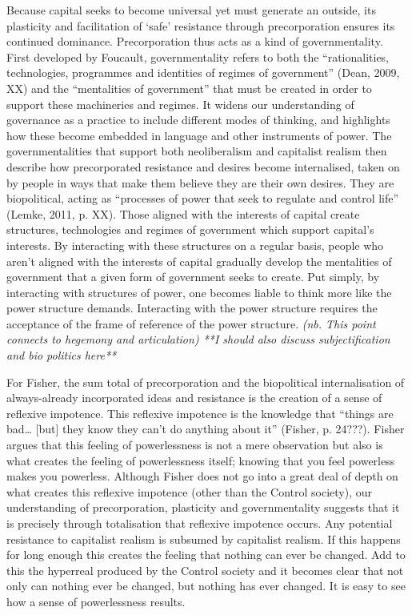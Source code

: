 Because capital seeks to become universal yet must generate an outside,
its plasticity and facilitation of `safe' resistance through
precorporation ensures its continued dominance. Precorporation thus acts
as a kind of governmentality. First developed by Foucault,
governmentality refers to both the ``rationalities, technologies,
programmes and identities of regimes of government'' (Dean, 2009, XX)
and the ``mentalities of government'' that must be created in order to
support these machineries and regimes. It widens our understanding of
governance as a practice to include different modes of thinking, and
highlights how these become embedded in language and other instruments
of power. The governmentalities that support both neoliberalism and
capitalist realism then describe how precorporated resistance and
desires become internalised, taken on by people in ways that make them
believe they are their own desires. They are biopolitical, acting as
``processes of power that seek to regulate and control life'' (Lemke,
2011, p. XX). Those aligned with the interests of capital create
structures, technologies and regimes of government which support
capital's interests. By interacting with these structures on a regular
basis, people who aren't aligned with the interests of capital gradually
develop the mentalities of government that a given form of government
seeks to create. Put simply, by interacting with structures of power,
one becomes liable to think more like the power structure demands.
Interacting with the power structure requires the acceptance of the
frame of reference of the power structure. \emph{\emph{(nb. This point
connects to hegemony and articulation) **I should also discuss
subjectification and bio politics here**}}

For Fisher, the sum total of precorporation and the biopolitical
internalisation of always-already incorporated ideas and resistance is
the creation of a sense of reflexive impotence. This reflexive impotence
is the knowledge that ``things are bad\ldots{} {[}but{]} they know they
can't do anything about it'' (Fisher, p. 24???). Fisher argues that this
feeling of powerlessness is not a mere observation but also is what
creates the feeling of powerlessness itself; knowing that you feel
powerless makes you powerless. Although Fisher does not go into a great
deal of depth on what creates this reflexive impotence (other than the
Control society), our understanding of precorporation, plasticity and
governmentality suggests that it is precisely through totalisation that
reflexive impotence occurs. Any potential resistance to capitalist
realism is subsumed by capitalist realism. If this happens for long
enough this creates the feeling that nothing can ever be changed. Add to
this the hyperreal produced by the Control society and it becomes clear
that not only can nothing ever be changed, but nothing has ever changed.
It is easy to see how a sense of powerlessness results.


